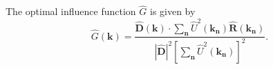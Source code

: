 The optimal influence function $\hat{G}$ is given by
\begin{equation*}
    \hat{G}(\mathbf{k}) = \frac{\hat{\mathbf{D}}(\mathbf{k}) \cdot \sum_{\mathbf{n}}\hat{U}^2(\mathbf{k_\mathbf{n}}) \hat{\mathbf{R}}(\mathbf{k}_\mathbf{n})}{|\hat{\mathbf{D}}|^2 \left[ \sum_{\mathbf{n}}\hat{U}^2(\mathbf{k}_\mathbf{n}) \right]^2}.
\end{equation*}
